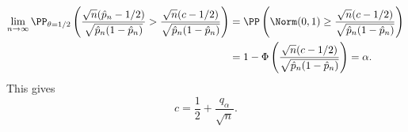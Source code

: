 \begin{align*}
    \lim_{n\rightarrow \infty}\PP_{\theta=1/2}\left(\frac{\sqrt{n}(\hat{p}_n-1/2)}{\sqrt{\hat{p}_n(1-\hat{p}_n)}} > \frac{\sqrt{n}(c-1/2)}{\sqrt{\hat{p}_n(1-\hat{p}_n)}}\right) &= \PP\left(\Norm(0,1) \geq \frac{\sqrt{n}(c-1/2)}{\sqrt{\hat{p}_n(1-\hat{p}_n)}}\right) \\
    &= 1-\Phi\left(\frac{\sqrt{n}(c-1/2)}{\sqrt{\hat{p}_n(1-\hat{p}_n)}}\right) = \alpha.
\end{align*}
This gives
\[c = \frac{1}{2} + \frac{q_\alpha}{\sqrt{n}}.\]








